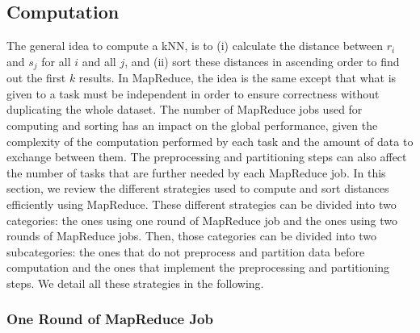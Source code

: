 \subsection{Computation} 

The general idea to compute a kNN, is to (i) calculate the distance between $r_i$ and $s_j$ for all $i$ and all 
$j$, and (ii) sort these distances in ascending order to 
find out the first $k$ results. In MapReduce, the idea is the same except that what is given to a task must be independent in order to ensure correctness without duplicating the whole dataset. The number of MapReduce jobs used for computing and sorting has
an impact on the global performance, given the complexity of the computation performed by each task and the amount of data to exchange between them. 
The preprocessing and partitioning steps can also affect the number of tasks that are further needed by each MapReduce job. 
In this section, we review the 
different strategies used to compute and sort distances efficiently using MapReduce. These different strategies can be divided into two categories: the ones 
using one round of MapReduce job and the ones using two rounds of MapReduce jobs. Then, those categories can be divided into two subcategories: the ones that do 
not preprocess and partition data before computation and the ones that implement the preprocessing and partitioning steps. We detail all these 
strategies in the following.

\subsubsection{One Round of MapReduce Job}

